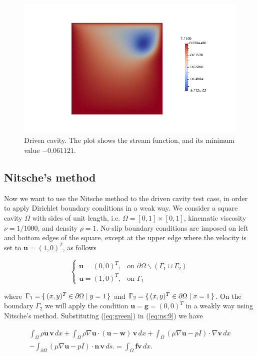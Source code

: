 \documentclass[a4paper,11pt,openright,twoside]{book}
\begin{document}
\vspace{-.3cm}
\begin{figure}[ht]
\centering
\includegraphics[width=\textwidth]{images/mine.png}
\vspace{-1cm}
\caption{Driven cavity. The plot shows the stream function, and its minimum value $-0.061 121$.}
\end{figure}


\subsection{Nitsche's method}
Now we want to use the Nitsche method to the driven cavity test case, in order to apply Dirichlet boundary conditions in a weak way. We consider a square cavity $\Omega$ with sides of unit length, i.e. $\Omega = [0,1] \times [0,1]$, kinematic viscosity $\nu = 1/1000$, and density $\rho = 1$. No-slip boundary conditions are imposed on left and bottom edges of the square, except at the upper edge where the velocity is set to $\mathbf{u} = (1,0)^T$, as follows

\[
\begin{cases}
\mathbf{u} = (0, 0)^T, & \mbox{on } \partial \Omega \backslash (\Gamma_1 \cup \Gamma_2) \\
\mathbf{u} = (1, 0)^T, & \mbox{on } \Gamma_1
\end{cases}
\]

where $ \Gamma_1 = \set{ (x,y)^T \in \partial \Omega | y = 1}$ and
$ \Gamma_2 = \set{ (x,y)^T \in \partial \Omega | x = 1}$. On the boundary $\Gamma_2$ we will apply the condition $\mathbf{u} = \mathbf{g} = (0,0)^T$ in a weakly way using Nitsche's method. Substituting (\ref{eq:green}) in (\ref{eq:ns:9}) we have

\begin{align}
\int_{\Omega} \rho \dot{\mathbf{u}} \, \mathbf{v} \, dx
+ \int_{\Omega} \rho \nabla \mathbf{u} \cdot (\mathbf{u} - \mathbf{w}) \, \mathbf{v} \, dx
+ \int_{\Omega} (\mu \nabla \mathbf{u} - pI) \cdot \nabla \mathbf{v} \, dx \\
- \int_{\partial \Omega} (\mu \nabla \mathbf{u} - pI) \cdot \mathbf{n} \, \mathbf{v} \, ds.
= \int_{\Omega} \mathbf{f} \mathbf{v} \, dx.
\end{align}
\end{document}
